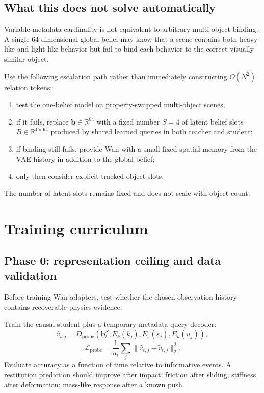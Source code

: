 \documentclass[11pt]{article}
\newcommand{\bvec}{\bm b}
\newcommand{\R}{\mathbb R}
\begin{document}
\subsection{What this does not solve automatically}

Variable metadata cardinality is not equivalent to arbitrary multi-object
binding.  A single 64-dimensional global belief may know that a scene contains
both heavy-like and light-like behavior but fail to bind each behavior to the
correct visually similar object.

Use the following escalation path rather than immediately constructing
$O(N^2)$ relation tokens:
\begin{enumerate}
  \item test the one-belief model on property-swapped multi-object scenes;
  \item if it fails, replace $\bvec\in\R^{64}$ with a fixed number $S=4$ of
  latent belief slots $B\in\R^{4\times64}$ produced by shared learned queries
  in both teacher and student;
  \item if binding still fails, provide Wan with a small fixed spatial memory
  from the VAE history in addition to the global belief;
  \item only then consider explicit tracked object slots.
\end{enumerate}
The number of latent slots remains fixed and does not scale with object count.

\section{Training curriculum}

\subsection{Phase 0: representation ceiling and data validation}

Before training Wan adapters, test whether the chosen observation history
contains recoverable physics evidence.

Train the causal student plus a temporary metadata query decoder:
\begin{equation}
  \widehat v_{t,j}=D_{\mathrm{probe}}
  (\bvec_t^S,E_k(k_j),E_s(s_j),E_u(u_j)),
\end{equation}
\begin{equation}
  \mathcal L_{\mathrm{probe}}
  =\frac{1}{n_t}\sum_j
  \|\widehat v_{t,j}-\widetilde v_{t,j}\|_2^2.
\end{equation}
Evaluate accuracy as a function of time relative to informative events.  A
restitution prediction should improve after impact; friction after sliding;
stiffness after deformation; mass-like response after a known push.
\end{document}

